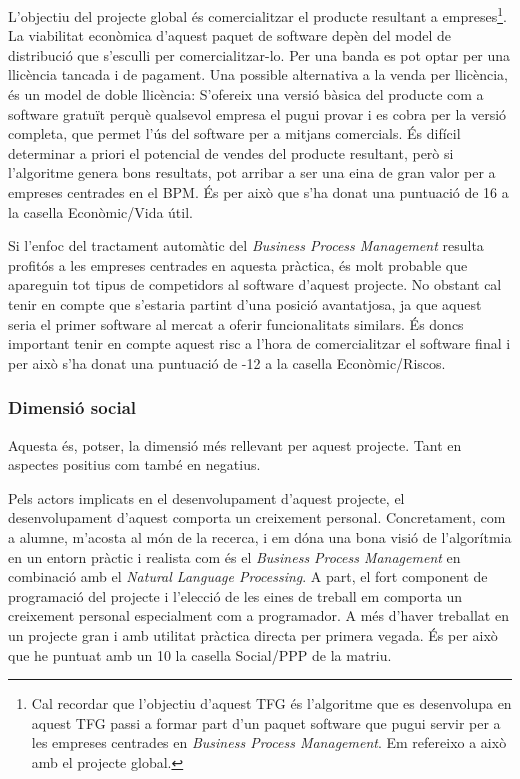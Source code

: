 \documentclass[10pt,a4paper]{article}
\begin{document}
L'objectiu del projecte global és comercialitzar el producte resultant a empreses\footnote{Cal recordar que l'objectiu d'aquest TFG és l'algoritme que es desenvolupa en aquest TFG passi a formar part d'un paquet software que pugui servir per a les empreses centrades en \emph{Business Process Management}. Em refereixo a això amb el projecte global.}. La viabilitat econòmica d'aquest paquet de software depèn del model de distribució que s'esculli per comercialitzar-lo. Per una banda es pot optar per una llicència tancada i de pagament. Una possible alternativa a la venda per llicència, és un model de doble llicència: S'ofereix una versió bàsica del producte com a software gratuït perquè qualsevol empresa el pugui provar i es cobra per la versió completa, que permet l'ús del software per a mitjans comercials. És difícil determinar a priori el potencial de vendes del producte resultant, però si l'algoritme genera bons resultats, pot arribar a ser una eina de gran valor per a empreses centrades en el BPM. És per això que s'ha donat una puntuació de 16 a la casella Econòmic/Vida útil.

Si l'enfoc del tractament automàtic del \emph{Business Process Management} resulta profitós a les empreses centrades en aquesta pràctica, és molt probable que apareguin tot tipus de competidors al software d'aquest projecte. No obstant cal tenir en compte que s'estaria partint d'una posició avantatjosa, ja que aquest seria el primer software al mercat a oferir funcionalitats similars. És doncs important tenir en compte aquest risc a l'hora de comercialitzar el software final i per això s'ha donat una puntuació de -12 a la casella Econòmic/Riscos.

\subsubsection{Dimensió social}

Aquesta és, potser, la dimensió més rellevant per aquest projecte. Tant en aspectes positius com també en negatius.

Pels actors implicats en el desenvolupament d'aquest projecte, el desenvolupament d'aquest comporta un creixement personal. Concretament, com a alumne, m'acosta al món de la recerca, i em dóna una bona visió de l'algorítmia en un entorn pràctic i realista com és el \emph{Business Process Management} en combinació amb el \emph{Natural Language Processing}. A part, el fort component de programació del projecte i l'elecció de les eines de treball em comporta un creixement personal especialment com a programador. A més d'haver treballat en un projecte gran i amb utilitat pràctica directa per primera vegada. És per això que he puntuat amb un 10 la casella Social/PPP de la matriu.
\end{document}
